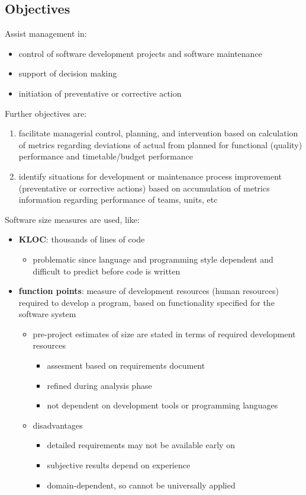 \documentclass[11pt]{article}
\begin{document}
\subsection{Objectives}
\label{sec:orgd033aeb}
Assist management in:
\begin{itemize}
\item control of software development projects and software maintenance
\item support of decision making
\item initiation of preventative or corrective action
\end{itemize}

Further objectives are:
\begin{enumerate}
\item facilitate managerial control, planning, and intervention based on calculation of metrics regarding
deviations of actual from planned for functional (quality) performance and timetable/budget
performance
\item identify situations for development or maintenance process improvement (preventative or
corrective actions) based on accumulation of metrics information regarding performance of
teams, units, etc
\end{enumerate}

Software size measures are used, like:
\begin{itemize}
\item \textbf{KLOC}: thousands of lines of code
\begin{itemize}
\item problematic since language and programming style dependent and difficult to
predict before code is written
\end{itemize}
\item \textbf{function points}: measure of development resources (human resources) required to develop a program,
based on functionality specified for the software system
\begin{itemize}
\item pre-project estimates of size are stated in terms of required development resources
\begin{itemize}
\item assesment based on requirements document
\item refined during analysis phase
\item not dependent on development tools or programming languages
\end{itemize}
\item disadvantages
\begin{itemize}
\item detailed requirements may not be available early on
\item subjective results depend on experience
\item domain-dependent, so cannot be universally applied
\end{itemize}
\end{itemize}
\end{itemize}
\end{document}
